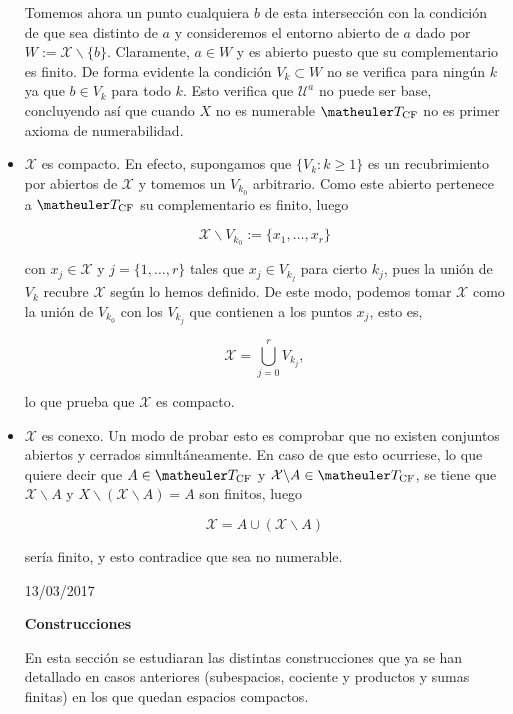\begin{itemize}
Tomemos ahora un punto cualquiera $b$ de esta intersección con la condición de que sea distinto de $a$ y consideremos el entorno abierto de $a$ dado por $W:=\mathcal{X}\backslash \{b\}$. Claramente, $a\in W$ y es abierto puesto que su complementario es finito.  De forma evidente la condición $V_k \subset W$ no se verifica para ningún $k$ ya que $b\in V_k$ para todo $k$. Esto verifica que $\mathcal{U}^a$ no puede ser base, concluyendo así que cuando $X$ no es numerable $\T_{\text{CF}}$ no es primer axioma de numerabilidad.

\item $\mathcal{X}$ es compacto. En efecto, supongamos que $\{V_k : k \geq 1\}$ es un recubrimiento por abiertos de $\mathcal{X}$ y tomemos un $V_{k_0}$ arbitrario. Como este abierto pertenece a $\T_{\text{CF}}$ su complementario es finito, luego 

\[\mathcal{X} \backslash V_{k_0} := \{x_1, \ldots, x_r\}\]

con $x_j \in \mathcal{X}$ y $j=\{1,\ldots, r\}$ tales que $x_j\in V_{k_j}$ para cierto $k_j$, pues la unión de $V_k$ recubre $\mathcal{X}$ según lo hemos definido. De este modo, podemos tomar $\mathcal{X}$ como la unión de $V_{k_0}$ con los $V_{k_j}$ que contienen a los puntos $x_j$, esto es,

\[\mathcal{X}=\bigcup_{j=0}^r V_{k_j},\]

lo que prueba que $\mathcal{X}$ es compacto. 

\item $\mathcal{X}$ es conexo. Un modo de probar esto es comprobar que no existen conjuntos abiertos y cerrados simultáneamente. En caso de que esto ocurriese, lo que quiere decir que $A\in \T_{\text{CF}}$ y $\mathcal{X}\backslash A \in \T_{\text{CF}}$, se tiene que $\mathcal{X} \backslash A$ y $X\backslash (\mathcal{X}\backslash A)=A$ son finitos, luego

\[\mathcal{X}=A \cup (\mathcal{X}\backslash A)\]

sería finito, y esto contradice que sea no numerable. 



13/03/2017

\textbf{Construcciones}

En esta sección se estudiaran las distintas construcciones que ya se han detallado en casos anteriores (subespacios, cociente y productos y sumas finitas) en los que quedan espacios compactos. 


\end{itemize}
